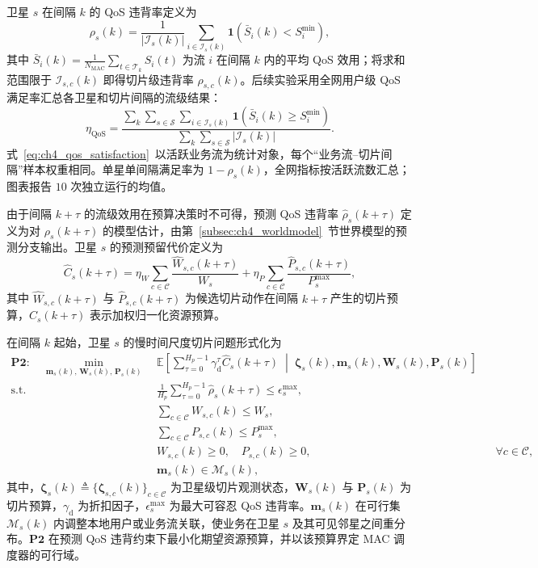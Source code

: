 卫星 $s$ 在间隔 $k$ 的 QoS 违背率定义为
\begin{equation}\label{eq:ch4_viol}
\rho_s(k)=\frac{1}{|\mathcal I_s(k)|}\sum_{i\in\mathcal I_s(k)}\mathbf 1\!\left(\bar S_i(k)<S_i^{\min}\right),
\end{equation}
其中 $\bar S_i(k)=\frac{1}{N_\text{MAC}}\sum_{t\in\mathcal T_k}S_i(t)$ 为流 $i$ 在间隔 $k$ 内的平均 QoS 效用；将求和范围限于 $\mathcal I_{s,c}(k)$ 即得切片级违背率 $\rho_{s,c}(k)$。后续实验采用全网用户级 QoS 满足率汇总各卫星和切片间隔的流级结果：
\begin{equation}\label{eq:ch4_qos_satisfaction}
\eta_{\mathrm{QoS}}
=\frac{\displaystyle\sum_k\sum_{s\in\mathcal S}\sum_{i\in\mathcal I_s(k)}
\mathbf 1\!\left(\bar S_i(k)\ge S_i^{\min}\right)}
{\displaystyle\sum_k\sum_{s\in\mathcal S}\left|\mathcal I_s(k)\right|}.
\end{equation}
式~\eqref{eq:ch4_qos_satisfaction}~以活跃业务流为统计对象，每个“业务流--切片间隔”样本权重相同。单星单间隔满足率为 $1-\rho_s(k)$，全网指标按活跃流数汇总；图表报告 $10$ 次独立运行的均值。

由于间隔 $k+\tau$ 的流级效用在预算决策时不可得，预测 QoS 违背率 $\hat\rho_s(k+\tau)$ 定义为对 $\rho_s(k+\tau)$ 的模型估计，由第~\ref{subsec:ch4_worldmodel}~节世界模型的预测分支输出。卫星 $s$ 的预测预留代价定义为
\begin{equation}\label{eq:ch4_predcost}
\hat C_s(k+\tau)=\eta_W\sum_{c\in\mathcal C}\frac{\hat W_{s,c}(k+\tau)}{W_s}+\eta_P\sum_{c\in\mathcal C}\frac{\hat P_{s,c}(k+\tau)}{P_s^{\max}},
\end{equation}
其中 $\hat W_{s,c}(k+\tau)$ 与 $\hat P_{s,c}(k+\tau)$ 为候选切片动作在间隔 $k+\tau$ 产生的切片预算，$\hat C_s(k+\tau)$ 表示加权归一化资源预算。

在间隔 $k$ 起始，卫星 $s$ 的慢时间尺度切片问题形式化为
\begin{equation}\label{eq:ch4_P2}
\begin{aligned}
\mathbf{P2:}\quad \min_{\mathbf m_s(k),\,\mathbf W_s(k),\,\mathbf P_s(k)}\ &\mathbb E\!\left[\sum_{\tau=0}^{H_p-1}\gamma_{\mathrm d}^{\tau}\hat C_s(k+\tau)\;\middle|\;\boldsymbol\zeta_s(k),\mathbf m_s(k),\mathbf W_s(k),\mathbf P_s(k)\right]\\
\text{s.t.}\quad &\frac{1}{H_p}\sum_{\tau=0}^{H_p-1}\hat\rho_s(k+\tau)\le\epsilon_s^{\max},\\
&\sum_{c\in\mathcal C}W_{s,c}(k)\le W_s,\\
&\sum_{c\in\mathcal C}P_{s,c}(k)\le P_s^{\max},\\
&W_{s,c}(k)\ge0,\quad P_{s,c}(k)\ge0,&&\forall c\in\mathcal C,\\
&\mathbf m_s(k)\in\mathcal M_s(k),&&
\end{aligned}
\end{equation}
其中，$\boldsymbol\zeta_s(k)\triangleq\{\boldsymbol\zeta_{s,c}(k)\}_{c\in\mathcal C}$ 为卫星级切片观测状态，$\mathbf W_s(k)$ 与 $\mathbf P_s(k)$ 为切片预算，$\gamma_{\mathrm d}$ 为折扣因子，$\epsilon_s^{\max}$ 为最大可容忍 QoS 违背率。$\mathbf m_s(k)$ 在可行集 $\mathcal M_s(k)$ 内调整本地用户或业务流关联，使业务在卫星 $s$ 及其可见邻星之间重分布。$\mathbf{P2}$ 在预测 QoS 违背约束下最小化期望资源预算，并以该预算界定 MAC 调度器的可行域。

